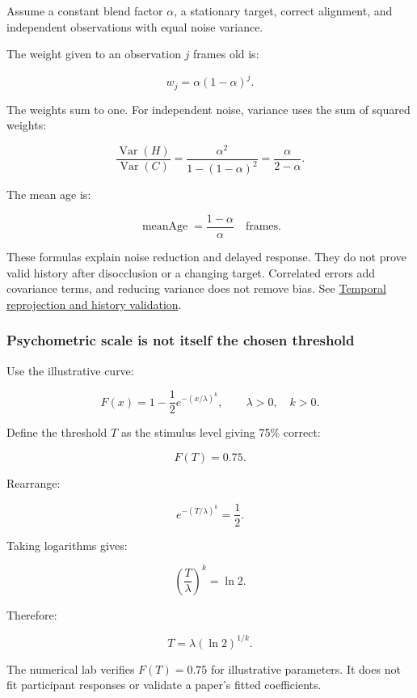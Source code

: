 \hypertarget{04-visual-computing-ii-ch043-temporal-variance-and-age-are-conditional-results}{}

Assume a constant blend factor \(\alpha\), a stationary target, correct alignment, and independent observations with equal noise variance.

The weight given to an observation \(j\) frames old is:

\[
w_j=\alpha(1-\alpha)^j.
\]

The weights sum to one. For independent noise, variance uses the sum of squared weights:

\[
\frac{\operatorname{Var}(H)}{\operatorname{Var}(C)}
=\frac{\alpha^2}{1-(1-\alpha)^2}
=\frac{\alpha}{2-\alpha}.
\]

The mean age is:

\[
\operatorname{meanAge}=\frac{1-\alpha}{\alpha}
\quad\text{frames}.
\]

These formulas explain noise reduction and delayed response. They do not prove valid history after disocclusion or a changing target. Correlated errors add covariance terms, and reducing variance does not remove bias. See \hyperref[appendix-0727340a4428]{Temporal reprojection and history validation}.

\subsubsection{Psychometric scale is not itself the chosen threshold}\label{04-visual-computing-ii-ch043-psychometric-scale-is-not-itself-the-chosen-threshold}

\hypertarget{04-visual-computing-ii-ch043-psychometric-scale-is-not-itself-the-chosen-threshold}{}

Use the illustrative curve:

\[
F(x)=1-\frac12e^{-(x/\lambda)^k},
\qquad \lambda>0,\quad k>0.
\]

Define the threshold \(T\) as the stimulus level giving 75\% correct:

\[
F(T)=0.75.
\]

Rearrange:

\[
e^{-(T/\lambda)^k}=\frac12.
\]

Taking logarithms gives:

\[
\left(\frac{T}{\lambda}\right)^k=\ln2.
\]

Therefore:

\[
T=\lambda(\ln2)^{1/k}.
\]

The numerical lab verifies \(F(T)=0.75\) for illustrative parameters. It does not fit participant responses or validate a paper's fitted coefficients.

